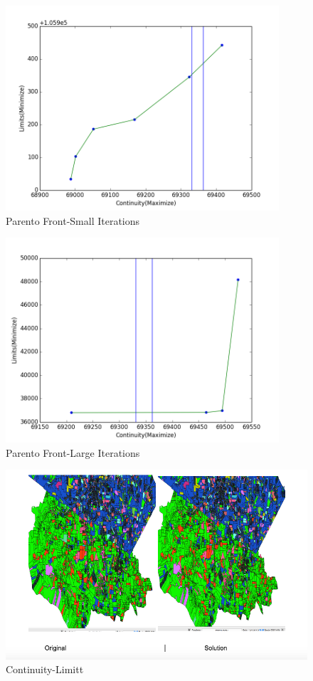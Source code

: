 \documentclass[12pt]{article} %
\begin{document}
\begin{figure}[h]
\begin{center}
\includegraphics[width=4in]{Updated.png}
\caption{Parento Front-Small Iterations}
\end{center}
\end{figure}
\begin{figure}[h]
\begin{center}
\includegraphics[width=4in]{Optimal-Solutions2.png}
\caption{Parento Front-Large Iterations}
\end{center}
\end{figure}
\begin{figure}[h]
\begin{center}
\includegraphics[width=5.in]{com.png}
\caption{Continuity-Limitt}
\end{center}
\end{figure}
\end{document}
